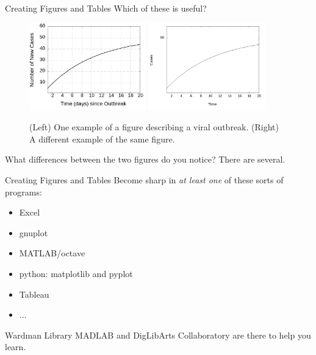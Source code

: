 \documentclass{beamer}
\begin{document}
\begin{frame}{Creating Figures and Tables}
Which of these is useful?
\begin{figure}
\includegraphics[width=0.45\textwidth]{figures/outbreak.png}
\includegraphics[width=0.45\textwidth]{figures/outbreak2.png}
\caption{\label{fig:outbreak} (Left) One example of a figure describing a viral outbreak. (Right) A different example of the same figure.}
\end{figure}
What differences between the two figures do you notice?  There are several.
\end{frame}

\begin{frame}{Creating Figures and Tables}
Become sharp in \textit{at least one} of these sorts of programs:
\begin{itemize}
\item Excel
\item gnuplot
\item MATLAB/octave
\item python: matplotlib and pyplot
\item Tableau
\item ...
\end{itemize}
\alert{Wardman Library MADLAB and DigLibArts Collaboratory} are there to help you learn.
\end{frame}
\end{document}
